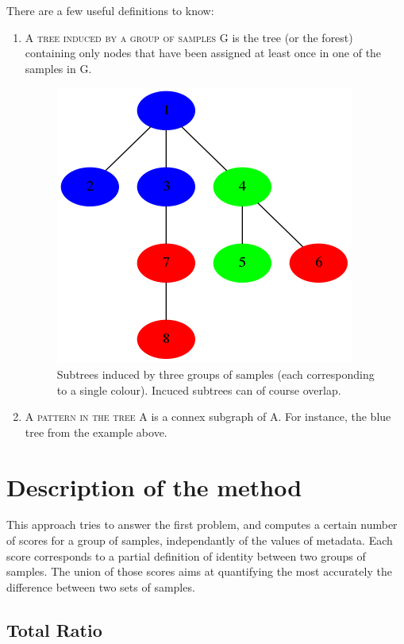 \documentclass{report}
\begin{document}
There are a few useful definitions to know:
\begin{enumerate}
\item \textsc{A tree induced by a group of samples G} is the tree (or the forest) containing only nodes that have been assigned at least once in one of the samples in \textsc{G}.

\begin{figure}[H]
\centering
\includegraphics[scale=0.5]{illustrations/inducedtree.png}
\caption{Subtrees induced by three groups of samples (each corresponding to a single colour). Incuced subtrees can of course overlap.}
\end{figure}

\item \textsc{A pattern in the tree A} is a connex subgraph of \textsc{A}. For instance, the blue tree from the example above.
\end{enumerate}

\newpage

\section{Description of the method}

This approach tries to answer the first problem, and computes a certain number of scores for a group of samples, independantly of the values of metadata. Each score corresponds to a partial definition of identity between two groups of samples. The union of those scores aims at quantifying the most accurately the difference between two sets of samples.

\subsection{Total Ratio}
\end{document}
